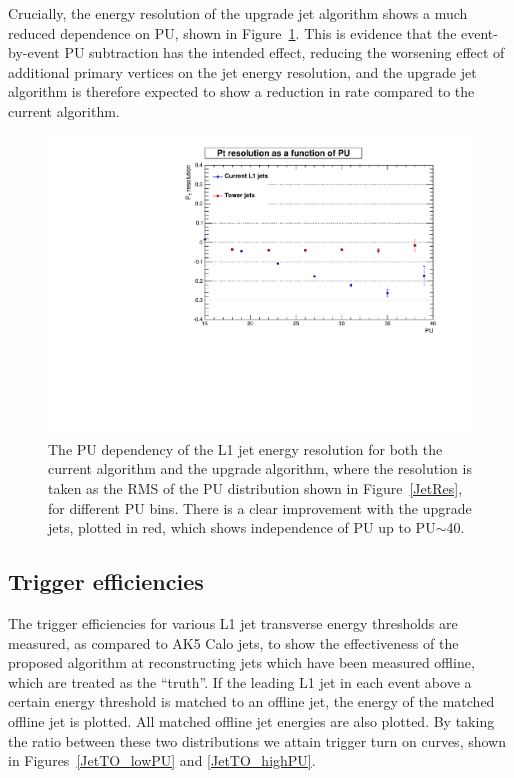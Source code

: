 Crucially, the energy resolution of the upgrade jet algorithm shows a much reduced dependence on \ac{PU}, shown in Figure~\ref{JetResPU}.
This is evidence that the event-by-event \ac{PU} subtraction has the intended effect, 
reducing the worsening effect of additional primary vertices on the jet energy resolution, 
and the upgrade jet algorithm is therefore expected to show a reduction in rate compared to the current algorithm.

\begin{figure}[t!]
\begin{center}
  \includegraphics[scale=0.52]{Figures/l1jets/Ptres_vsPU.pdf}
\caption{The \ac{PU} dependency of the \ac{L1} jet energy resolution for both the current algorithm and the upgrade algorithm, where the resolution is taken as the RMS of the PU distribution shown in Figure~\ref{JetRes}, for different \ac{PU} bins. There is a clear improvement with the upgrade jets, plotted in red, which shows independence of \ac{PU} up to \ac{PU}$\sim$40.}
\label{JetResPU}
\end{center}
\end{figure}

\subsection{Trigger efficiencies}
The trigger efficiencies for various \ac{L1} jet transverse energy thresholds are measured, as compared to AK5 Calo jets, to show the effectiveness of the proposed algorithm at reconstructing jets which have been measured offline, which are treated as the ``truth''.
If the leading \ac{L1} jet in each event above a certain energy threshold is matched to an offline jet, the energy of the matched offline jet is plotted. 
All matched offline jet energies are also plotted. 
By taking the ratio between these two distributions we attain trigger turn on curves, shown in Figures~\ref{JetTO_lowPU} and \ref{JetTO_highPU}.

